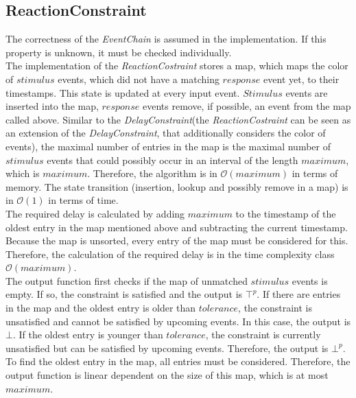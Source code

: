 \subsection{ReactionConstraint}
	The correctness of the \textit{EventChain} is assumed in the implementation. If this property is unknown, it must be checked individually.\\
	The implementation of the \emph{ReactionCostraint} stores a map, which maps the color of $stimulus$ events, which did not have a matching $response$ event yet, to their timestamps. This state is updated at every input event. $Stimulus$ events are inserted into the map, $response$ events remove, if possible, an event from the map called above. Similar to the \emph{DelayConstraint}(the \emph{ReactionCostraint} can be seen as an extension of the \emph{DelayConstraint}, that additionally considers the color of events), the maximal number of entries in the map is the maximal number of $stimulus$ events that could possibly occur in an interval of the length $maximum$, which is $maximum$.  Therefore, the algorithm is in $\mathcal{O}(maximum)$ in terms of memory. The state transition (insertion, lookup and possibly remove in a map) is in $\mathcal{O}(1)$ in terms of time.\\
	The required delay is calculated by adding $maximum$ to the timestamp of the oldest entry in the map mentioned above and subtracting the current timestamp. Because the map is unsorted, every entry of the map must be considered for this. Therefore, the calculation of the required delay is in the time complexity class $\mathcal{O}(maximum)$.\\
	The output function first checks if the map of unmatched $stimulus$ events is empty. If so, the constraint is satisfied and the output is $\top^p$. If there are entries in the map and the oldest entry is older than $tolerance$, the constraint is unsatisfied and cannot be satisfied by upcoming events. In this case, the output is $\bot$. If the oldest entry is younger than $tolerance$, the constraint is currently unsatisfied but can be satisfied by upcoming events. Therefore, the output is $\bot^p$. To find the oldest entry in the map, all entries must be considered. Therefore, the output function is linear dependent on the size of this map, which is at most $maximum$.
	
